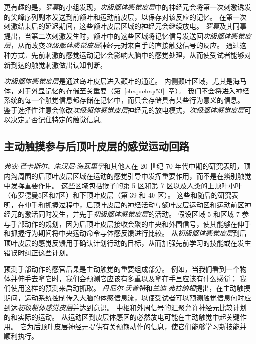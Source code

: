 更有趣的是，\textit{罗莫}的小组发现，\textit{次级躯体感觉皮层}中的神经元会将第一次刺激诱发的尖峰序列副本发送到前额叶和运动前皮层，以保存对该反应的记忆。
在第一次刺激结束后的延迟期间，这些额叶皮层区域的神经元会继续放电。
\textit{罗莫}及其同事提出，当第二次刺激发生时，额叶中的这些区域将记忆信号发送回\textit{次级躯体感觉皮层}，从而改变\textit{次级躯体感觉皮层}神经元对来自手的直接触觉信号的反应。
通过这种方式，先前刺激的感觉运动记忆会影响大脑中的感觉处理，从而使受试者能够对新到达的触觉刺激做出认知判断。


\textit{次级躯体感觉皮层}是通过岛叶皮层进入颞叶的通道。
内侧颞叶区域，尤其是海马体，对于外显记忆的存储至关重要（第~\ref{chap:chap53}~章）。
我们不会将进入神经系统的每一个触觉信息都存储在记忆中，而只会存储具有某些行为意义的信息。
鉴于选择性注意会修改\textit{次级躯体感觉皮层}神经元的放电模式，\textit{次级躯体感觉皮层}可以决定是否记住特定的触觉信息。



\subsection{主动触摸参与后顶叶皮层的感觉运动回路}

\textit{弗农$\cdot$芒卡斯尔}、\textit{朱汉尼$\cdot$海瓦里宁}和其他人在 20 世纪 70 年代中期的研究表明，顶内沟周围的后顶叶皮层区域在运动的感觉引导中发挥重要作用，而不是在辨别触觉中发挥重要作用。
这些区域包括猴子的第 5 区和第 7 区以及人类的上顶叶小叶（布罗德曼5区和7区）和下顶叶皮层（第 39 和 40 区）。
这些和随后的研究表明，在伸手和抓握过程中，后顶叶皮层的神经活动与额叶皮层运动区和运动前区神经元的激活同时发生，并先于\textit{初级躯体感觉皮层}的活动。
假设区域 5 和区域 7 参与手部动作的规划，因为后顶叶皮层接收会聚的中央和外围信号，使其能够在伸手和抓握行为期间将中央运动命令与体感反馈进行比较。
从\textit{初级躯体感觉皮层}到后顶叶皮层的感觉反馈用于确认计划行动的目标，从而加强先前学习的技能或在发生错误时纠正这些计划。


预测手部动作的感官后果是主动触觉的重要组成部分。
例如，当我们看到一个物体并伸手去拿它时，我们会预测它应该有多重以及拿在手里应该有什么感觉；
我们使用这样的预测来启动抓取。
\textit{丹尼尔$\cdot$沃普特}和\textit{兰迪$\cdot$弗拉纳根}提出，在主动触摸期间，运动系统控制传入大脑的体感信息流，以便受试者可以预测触觉信息何时应到达\textit{初级躯体感觉皮层}并达到意识。 
中枢和外周信号的汇聚允许神经元比较计划的和实际的运动。
从运动区到皮层体感区的必然放电可能在主动触觉中起关键作用。
它为后顶叶皮层神经元提供有关预期动作的信息，使它们能够学习新技能并顺利执行。



